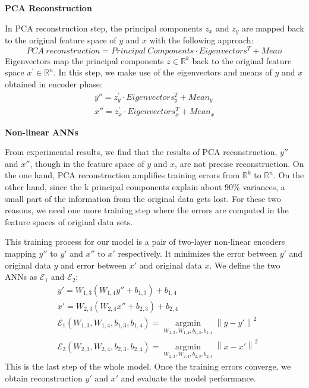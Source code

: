 \documentclass[12pt]{report} %
\newcommand{\norm}[1]{\left\lVert #1 \right\rVert}
\begin{document}
\textbf{PCA Reconstruction}

In PCA reconstruction step, the principal components $z_x$ and $z_y$ are mapped back to the original feature space of $y$ and $x$ with the following approach:
\begin{equation}
PCA\ reconstruction=Principal\ Components \cdot Eigenvectors^T + Mean
\end{equation}
Eigenvectors map the principal components $z\in \mathbb{R}^{k}$ back to the original feature space $x^{'}\in \mathbb{R}^{n}$. In this step, we make use of the eigenvectors and means of $y$ and $x$ obtained in encoder phase:
\begin{equation}
\begin{split}
y''= z_y^{'}\cdot Eigenvectors_{y}^T + Mean_y \\
x''= z_x^{'}\cdot Eigenvectors_{x}^T + Mean_x
\end{split}
\end{equation}

\textbf{Non-linear ANNs}

From experimental results, we find that the results of PCA reconstruction, $y''$ and $x''$, though in the feature space of $y$ and $x$, are not precise reconstruction. On the one hand, PCA reconstruction amplifies training errors from $\mathbb{R}^{k}$ to $\mathbb{R}^{n}$. On the other hand, since the k principal components explain about 90\% variances, a small part of the information from the original data gets lost. For these two reasons, we need one more training step where the errors are computed in the feature spaces of original data sets.

This training process for our model is a pair of two-layer non-linear encoders mapping $y''$ to $y'$ and $x''$ to $x'$ respectively. It minimizes the error between $y'$ and original data $y$ and error between $x'$ and original data $x$. We define the two ANNs as $\mathcal{E}_1$ and $\mathcal{E}_2$:
\begin{equation}
\begin{split}
&y'=W_{1,3}(W_{1,4}y''+b_{1,3})+b_{1,4} \\
&x'=W_{2,3}(W_{2,4}x''+b_{2,3})+b_{2,4} \\
&\mathcal{E}_1(W_{1,3},W_{1,4},b_{1,3},b_{1,4})=\operatorname*{argmin}_{W_{1,3},W_{1,4},b_{1,3},b_{1,4}}\norm{y-y'}^2 \\
&\mathcal{E}_2(W_{2,3},W_{2,4},b_{2,3},b_{2,4})=\operatorname*{argmin}_{W_{2,3},W_{2,4},b_{2,3},b_{2,4}}\norm{x-x'}^2
\end{split}
\end{equation}
This is the last step of the whole model. Once the training errors converge, we obtain reconstruction $y'$ and $x'$ and evaluate the model performance.
\end{document}
